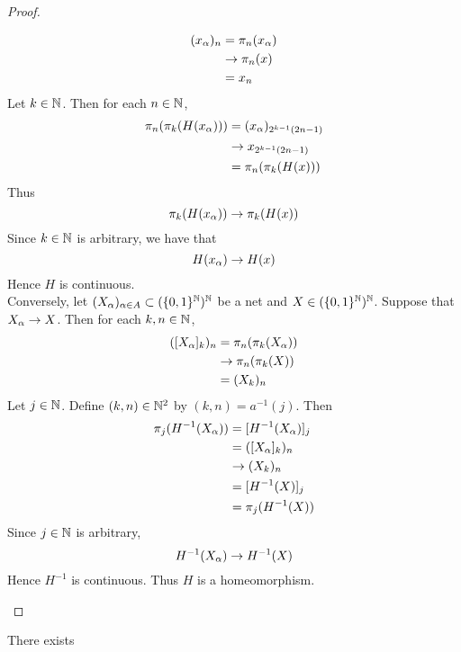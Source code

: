 \documentclass{book}
\begin{document}
\begin{proof}
\begin{enumerate}
			\begin{align*}
				(x_{\alpha})_n
				& = \pi_n(x_{\alpha}) \\
				& \rightarrow \pi_n(x) \\
				& = x_n 
			\end{align*}
			Let $k \in \mathbb{N}$. Then for each $n \in \mathbb{N}$,
			\begin{align*}
				\pi_{n}(\pi_k(H(x_{\alpha})))
				& = (x_{\alpha})_{ 2^{k-1}(2n -1)} \\
				& \rightarrow x_{2^{k-1}(2n -1)} \\
				& = \pi_n(\pi_k(H(x)))
			\end{align*}
			Thus 
			$$\pi_k(H(x_{\alpha})) \rightarrow \pi_k(H(x))$$
			Since $k \in \mathbb{N}$ is arbitrary, we have that 
			$$H(x_{\alpha}) \rightarrow H(x)$$
			Hence $H$ is continuous. \\
			Conversely, let $(X_{\alpha})_{\alpha \in A} \subset (\{0,1\}^{\mathbb{N}})^{\mathbb{N}}$ be a net and $X \in (\{0,1\}^{\mathbb{N}})^{\mathbb{N}}$. Suppose that $X_{\alpha} \rightarrow X$. Then for each $k, n \in \mathbb{N}$, 
			\begin{align*}
				([X_{\alpha}]_k)_n  
				& = \pi_n(\pi_k(X_{\alpha})) \\
				& \rightarrow \pi_n(\pi_k(X)) \\ 
				& = (X_k)_n
			\end{align*}
			Let $j \in \mathbb{N}$. Define $(k,n) \in \mathbb{N}^2$ by $(k,n) = a^{-1}(j)$. Then 
			\begin{align*}
				\pi_j(H^{-1}(X_{\alpha}))
				& = [H^{-1}(X_{\alpha})]_j \\
				& = ([X_{\alpha}]_k)_n \\
				& \rightarrow (X_k)_n \\
				& = [H^{-1}(X)]_j \\
				& = \pi_j(H^{-1}(X))
			\end{align*}
			Since $j \in \mathbb{N}$ is arbitrary, 
			$$H^{-1}(X_{\alpha}) \rightarrow H^{-1}(X)$$
			Hence $H^{-1}$ is continuous. Thus $H$ is a homeomorphism.
		\end{enumerate}
	\end{proof}
	
	
	\begin{ex}
		There exists 
	\end{ex}
	
	
	
	
	
	
	
	
	
	
	
	
	
	
	
\end{document}
